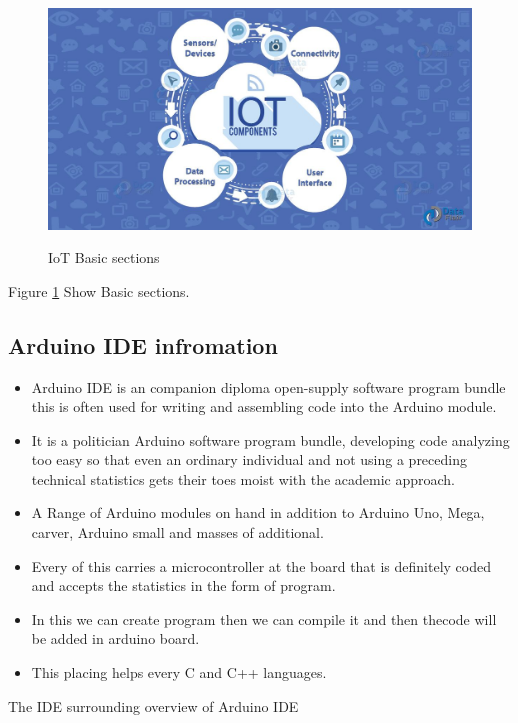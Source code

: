\documentclass[12pt,a4paper]{article}
\begin{document}
\begin{figure}[H]
	\centering
	\includegraphics[width=\linewidth]{IOT-Components.jpg}\\
	\caption{IoT Basic sections}
	\label{fig:3.4}
\end{figure}
\begin{center}
Figure \ref{fig:3.4} Show Basic sections.
\end{center}

\subsection{Arduino IDE infromation}
\vspace{0.1in}
\begin{itemize}
	\item Arduino IDE is an companion diploma open-supply software program bundle this is often used
for writing and assembling code into the Arduino module.
	\item It is a politician Arduino software program bundle, developing code analyzing too easy so
that even an ordinary individual and not using a preceding technical statistics gets their toes moist with the
academic approach.
	\item A Range of Arduino modules on hand in addition to Arduino Uno, Mega, carver, Arduino small and masses of additional.
	\item Every of this carries a microcontroller at the board that is definitely coded and accepts
the statistics in the form of program.
	\item In this we can create program then we can compile it and then thecode will be added in arduino board.
	\item This placing helps every C and C++ languages.
\end{itemize}
The IDE surrounding overview of Arduino IDE
\end{document}
